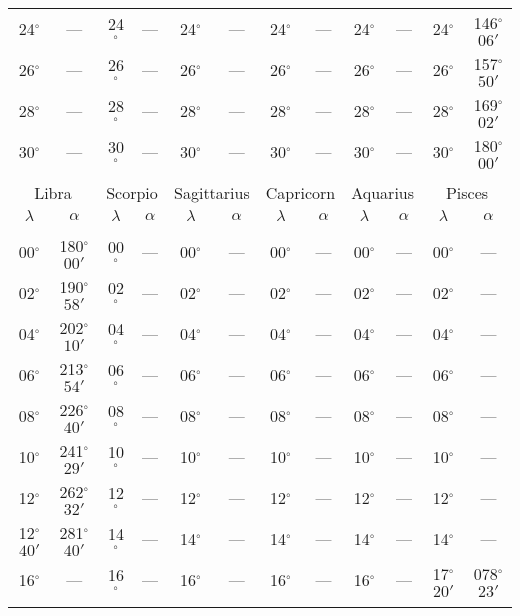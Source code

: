\begin{table}
{\begin{tabular}{cc|cc|cc|cc|cc|cc}
24$^\circ$ & --- & 24$^\circ$ & --- & 24$^\circ$ & --- & 24$^\circ$ & --- & 24$^\circ$ & --- & 24$^\circ$ & 146$^\circ$$06'$\\
26$^\circ$ & --- & 26$^\circ$ & --- & 26$^\circ$ & --- & 26$^\circ$ & --- & 26$^\circ$ & --- & 26$^\circ$ & 157$^\circ$$50'$\\
28$^\circ$ & --- & 28$^\circ$ & --- & 28$^\circ$ & --- & 28$^\circ$ & --- & 28$^\circ$ & --- & 28$^\circ$ & 169$^\circ$$02'$\\
30$^\circ$ & --- & 30$^\circ$ & --- & 30$^\circ$ & --- & 30$^\circ$ & --- & 30$^\circ$ & --- & 30$^\circ$ & 180$^\circ$$00'$\\
\multicolumn{12}{c}{}\\
\multicolumn{2}{c}{Libra}\vline & \multicolumn{2}{c}{Scorpio} \vline& \multicolumn{2}{c}{Sagittarius} \vline& \multicolumn{2}{c}{Capricorn}\vline &
\multicolumn{2}{c}{Aquarius}\vline & \multicolumn{2}{c}{Pisces}\\\hline
$\lambda$& $\alpha$& $\lambda$& $\alpha$& $\lambda$& $\alpha$& $\lambda$& $\alpha$& $\lambda$& $\alpha$& $\lambda$& $\alpha$\\\hline
&&&&&&&&&&&\\[-2ex]
00$^\circ$ & 180$^\circ$$00'$ & 00$^\circ$ & --- & 00$^\circ$ & --- & 00$^\circ$ & --- &  00$^\circ$ & --- & 00$^\circ$ & ---\\
02$^\circ$ & 190$^\circ$$58'$ & 02$^\circ$ & --- & 02$^\circ$ & --- & 02$^\circ$ & --- &  02$^\circ$ & --- & 02$^\circ$ & ---\\
04$^\circ$ & 202$^\circ$$10'$ & 04$^\circ$ & --- & 04$^\circ$ & --- & 04$^\circ$ & --- &  04$^\circ$ & --- & 04$^\circ$ & ---\\
06$^\circ$ & 213$^\circ$$54'$ & 06$^\circ$ & --- & 06$^\circ$ & --- & 06$^\circ$ & --- &  06$^\circ$ & --- & 06$^\circ$ & ---\\
08$^\circ$ & 226$^\circ$$40'$ & 08$^\circ$ & --- & 08$^\circ$ & --- & 08$^\circ$ & --- &  08$^\circ$ & --- & 08$^\circ$ & ---\\
10$^\circ$ & 241$^\circ$$29'$ & 10$^\circ$ & --- & 10$^\circ$ & --- & 10$^\circ$ & --- &  10$^\circ$ & --- & 10$^\circ$ & ---\\
12$^\circ$ & 262$^\circ$$32'$ & 12$^\circ$ & --- & 12$^\circ$ & --- & 12$^\circ$ & --- &  12$^\circ$ & --- & 12$^\circ$ & ---\\
12$^\circ$$40'$ & 281$^\circ$$40'$ & 14$^\circ$ & --- & 14$^\circ$ & --- & 14$^\circ$ & --- &  14$^\circ$ & --- & 14$^\circ$ & ---\\
16$^\circ$ & --- & 16$^\circ$ & --- & 16$^\circ$ & --- & 16$^\circ$ & --- &  16$^\circ$ & --- & 17$^\circ$$20'$ &078$^\circ$$23'$\\
$$
\end{tabular}}
\end{table}
